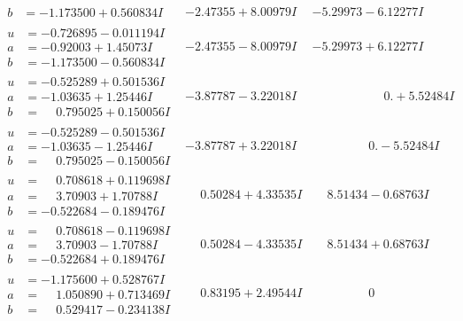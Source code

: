 \documentclass[1p]{elsarticle_modified}
\theoremstyle{definition}
\begin{document}
$$\begin{array}{c|c|c}
\begin{aligned}
b &= -1.173500 + 0.560834 I\end{aligned}
 & -2.47355 + 8.00979 I & -5.29973 - 6.12277 I \\ \hline\begin{aligned}
u &= -0.726895 - 0.011194 I \\
a &= -0.92003 + 1.45073 I \\
b &= -1.173500 - 0.560834 I\end{aligned}
 & -2.47355 - 8.00979 I & -5.29973 + 6.12277 I \\ \hline\begin{aligned}
u &= -0.525289 + 0.501536 I \\
a &= -1.03635 + 1.25446 I \\
b &= \phantom{-}0.795025 + 0.150056 I\end{aligned}
 & -3.87787 - 3.22018 I & \phantom{-0.000000 -}0. + 5.52484 I \\ \hline\begin{aligned}
u &= -0.525289 - 0.501536 I \\
a &= -1.03635 - 1.25446 I \\
b &= \phantom{-}0.795025 - 0.150056 I\end{aligned}
 & -3.87787 + 3.22018 I & \phantom{-0.000000 } 0. - 5.52484 I \\ \hline\begin{aligned}
u &= \phantom{-}0.708618 + 0.119698 I \\
a &= \phantom{-}3.70903 + 1.70788 I \\
b &= -0.522684 - 0.189476 I\end{aligned}
 & \phantom{-}0.50284 + 4.33535 I & \phantom{-}8.51434 - 0.68763 I \\ \hline\begin{aligned}
u &= \phantom{-}0.708618 - 0.119698 I \\
a &= \phantom{-}3.70903 - 1.70788 I \\
b &= -0.522684 + 0.189476 I\end{aligned}
 & \phantom{-}0.50284 - 4.33535 I & \phantom{-}8.51434 + 0.68763 I \\ \hline\begin{aligned}
u &= -1.175600 + 0.528767 I \\
a &= \phantom{-}1.050890 + 0.713469 I \\
b &= \phantom{-}0.529417 - 0.234138 I\end{aligned}
 & \phantom{-}0.83195 + 2.49544 I & \phantom{-0.000000 } 0 \\ \hline\begin{aligned}

\end{aligned}
\end{array}$$
\end{document}
